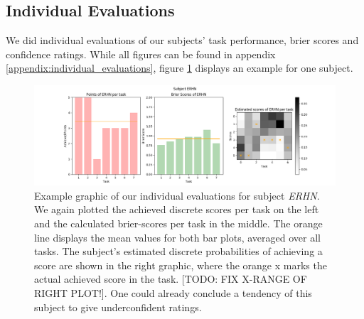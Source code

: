 \documentclass[../main/main.tex]{subfiles}
\begin{document}
\subsection{Individual Evaluations}
We did individual evaluations of our subjects' task performance, brier scores and confidence ratings. While all figures can be found in appendix \ref{appendix:individual_evaluations}, figure \ref{fig:erhn_results} displays an example for one subject.
\begin{figure}[h]
	\centering
	\captionsetup{justification=centering}
	\includegraphics[width=\textwidth]{../assets/ERHN_results.png}
	\caption{Example graphic of our individual evaluations for subject \textit{ERHN}. We again plotted the achieved discrete scores per task on the left and the calculated brier-scores per task in the middle. The orange line displays the mean values for both bar plots, averaged over all tasks. The subject's estimated discrete probabilities of achieving a score are shown in the right graphic, where the orange x marks the actual achieved score in the task. [TODO: FIX X-RANGE OF RIGHT PLOT!]. One could already conclude a tendency of this subject to give underconfident ratings.}
	\label{fig:erhn_results} 
\end{figure}
\end{document}
